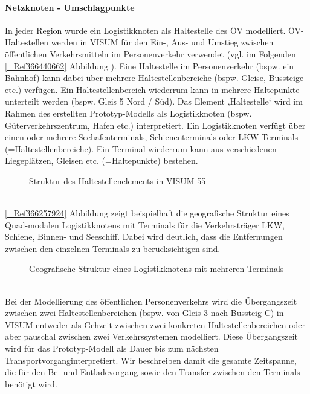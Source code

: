 \paragraph{Netzknoten - Umschlagpunkte}
In jeder Region wurde ein Logistikknoten als Haltestelle des ÖV modelliert. ÖV-Haltestellen werden in VISUM für den Ein-, Aus- und Umstieg zwischen öffentlichen Verkehrsmitteln im Personenverkehr verwendet (vgl. im Folgenden \autoref{_Ref366440662} Abbildung ). Eine Haltestelle im Personenverkehr (bspw. ein Bahnhof) kann dabei über mehrere Haltestellenbereiche (bspw. Gleise, Bussteige etc.) verfügen. Ein Haltestellenbereich wiederrum kann in mehrere Haltepunkte unterteilt werden (bspw. Gleis 5 Nord / Süd). Das Element ,Haltestelle‘ wird im Rahmen des erstellten Prototyp-Modells als Logistikknoten (bspw. Güterverkehrszentrum, Hafen etc.) interpretiert. Ein Logistikknoten verfügt über einen oder mehrere Seehafenterminals, Schienenterminals oder LKW-Terminals (=Haltestellenbereiche). Ein Terminal wiederrum kann aus verschiedenen Liegeplätzen, Gleisen etc. (=Haltepunkte) bestehen.~\\

\begin{figure}[htbp]
  \centering
  \caption{ Struktur des Haltestellenelements in VISUM 55 \textbf{ \autocites[][]{bib.1005}}}
  \label{_Ref366440662 _Ref366440634}
\end{figure}
~\\
\autoref{_Ref366257924} Abbildung  zeigt beispielhaft die geografische Struktur eines Quad-modalen Logistikknotens mit  Terminals für die Verkehrsträger LKW, Schiene, Binnen- und Seeschiff. Dabei wird deutlich, dass die Entfernungen zwischen den einzelnen Terminals zu berücksichtigen sind. ~\\

\begin{figure}[htbp]
  \centering
  \caption{ Geografische Struktur eines Logistikknotens mit mehreren Terminals}
  \label{_Ref366257924}
\end{figure}
~\\
Bei der Modellierung des öffentlichen Personenverkehrs wird die Übergangszeit zwischen zwei Haltestellenbereichen (bspw. von Gleis 3 nach Bussteig C) in VISUM entweder als Gehzeit zwischen zwei konkreten Haltestellenbereichen oder aber pauschal zwischen zwei Verkehrssystemen modelliert. Diese Übergangszeit wird für das Prototyp-Modell als \glqq Dauer bis zum nächsten Transportvorgang\grqq  interpretiert. Wir beschreiben damit die gesamte Zeitspanne, die für den Be- und Entladevorgang sowie den Transfer zwischen den Terminals benötigt wird.~\\


